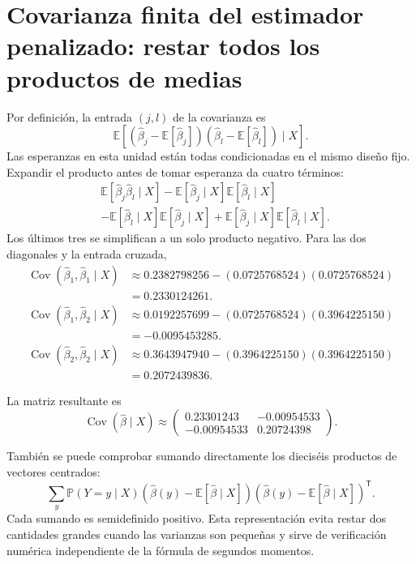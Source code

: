 \documentclass[11pt,a4paper]{article}
\newcommand{\E}{\mathbb E}
\newcommand{\Prob}{\mathbb P}
\newcommand{\T}{^{\mathsf T}}
\DeclareMathOperator{\Cov}{Cov}
\begin{document}
\section{Covarianza finita del estimador penalizado: restar todos los productos de medias}\label{logit143}
Por definición, la entrada \((j,l)\) de la covarianza es
\[
\E[(\widehat\beta_j-\E[\widehat\beta_j])
(\widehat\beta_l-\E[\widehat\beta_l])\mid X].
\]
Las esperanzas en esta unidad están todas condicionadas
en el mismo diseño fijo.
Expandir el producto antes de tomar esperanza da cuatro términos:
\[
\begin{aligned}
&\E[\widehat\beta_j\widehat\beta_l\mid X]
-\E[\widehat\beta_j\mid X]\E[\widehat\beta_l\mid X]\\
&-\E[\widehat\beta_l\mid X]\E[\widehat\beta_j\mid X]
+\E[\widehat\beta_j\mid X]\E[\widehat\beta_l\mid X].
\end{aligned}
\]
Los últimos tres se simplifican a un solo producto negativo.
Para las dos diagonales y la entrada cruzada,
\[
\begin{aligned}
\Cov(\widehat\beta_1,\widehat\beta_1\mid X)&\approx0.2382798256-(0.0725768524)(0.0725768524)\\&=0.2330124261.\end{aligned}
\]
\[
\begin{aligned}
\Cov(\widehat\beta_1,\widehat\beta_2\mid X)&\approx0.0192257699-(0.0725768524)(0.3964225150)\\&=-0.0095453285.\end{aligned}
\]
\[
\begin{aligned}
\Cov(\widehat\beta_2,\widehat\beta_2\mid X)&\approx0.3643947940-(0.3964225150)(0.3964225150)\\&=0.2072439836.\end{aligned}
\]

La matriz resultante es
\[
\Cov(\widehat\beta\mid X)\approx\begin{pmatrix}0.23301243&-0.00954533\\-0.00954533&0.20724398\end{pmatrix}.
\]

También se puede comprobar sumando directamente los dieciséis
productos de vectores centrados:
\[
\sum_y\Prob(Y=y\mid X)
(\widehat\beta(y)-\E[\widehat\beta\mid X])
(\widehat\beta(y)-\E[\widehat\beta\mid X])\T.
\]
Cada sumando es semidefinido positivo.
Esta representación evita restar dos cantidades grandes
cuando las varianzas son pequeñas y sirve de verificación
numérica independiente de la fórmula de segundos momentos.
\end{document}
